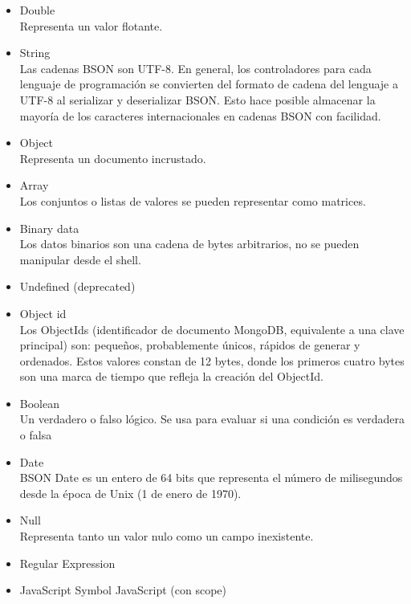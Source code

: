 \documentclass[twocolumn]{article}
\begin{document}
\begin{itemize}
  \item Double
  \\Representa un valor flotante.
  \item String
  \\Las cadenas BSON son UTF-8. En general,
   los controladores para cada lenguaje de 
   programación se convierten del formato de 
   cadena del lenguaje a UTF-8 al serializar y 
   deserializar BSON. Esto hace posible almacenar 
   la mayoría de los caracteres internacionales en cadenas 
   BSON con facilidad.

  \item Object
  \\Representa un documento incrustado.
  \item Array
  \\Los conjuntos o listas de valores se pueden representar como matrices.
  \item Binary data
  \\Los datos binarios son una cadena de bytes arbitrarios, no se pueden manipular desde el shell.
  \item Undefined (deprecated)
  \item Object id
  \\Los ObjectIds (identificador de documento MongoDB, equivalente a una clave principal) son: pequeños, probablemente únicos, rápidos de generar y ordenados. Estos valores constan de 12 bytes, donde los primeros cuatro bytes son una marca de tiempo que refleja la creación del ObjectId.
  
  \item Boolean
 \\ Un verdadero o falso lógico. Se usa para evaluar si una condición es verdadera o falsa
  \item Date
 \\ BSON Date es un entero de 64 bits que representa el número de milisegundos desde la época de Unix (1 de enero de 1970).
  \item Null
  \\Representa tanto un valor nulo como un campo inexistente.
  \item Regular Expression
  
  \item JavaScript Symbol JavaScript (con scope)
  

\end{itemize}
\end{document}
